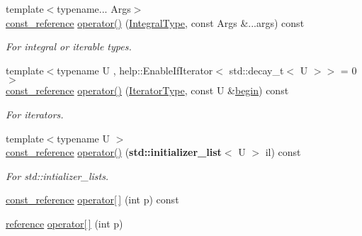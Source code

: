 {\bf }\par
\begin{DoxyCompactItemize}
\item 
{\footnotesize template$<$typename... Args$>$ }\\\hyperlink{classcnt_1_1help_1_1Slice_aed38e8e92115049f9c3b78ee67bdc5c4}{const\+\_\+reference} \hyperlink{classcnt_1_1help_1_1Slice_a5f6ebc78fcb07cb04aed2707e83efd92}{operator()} (\hyperlink{structcnt_1_1help_1_1IntegralType}{Integral\+Type}, const Args \&...args) const 
\begin{DoxyCompactList}\small\item\em For integral or iterable types. \end{DoxyCompactList}\item 
{\footnotesize template$<$typename U , help\+::\+Enable\+If\+Iterator$<$ std\+::decay\+\_\+t$<$ U $>$$>$  = 0$>$ }\\\hyperlink{classcnt_1_1help_1_1Slice_aed38e8e92115049f9c3b78ee67bdc5c4}{const\+\_\+reference} \hyperlink{classcnt_1_1help_1_1Slice_a28aad2a3fb6704596e1a317add0e3477}{operator()} (\hyperlink{structcnt_1_1help_1_1IteratorType}{Iterator\+Type}, const U \&\hyperlink{classcnt_1_1help_1_1Slice_aa5686f75940716e2568165e3b88d89d3}{begin}) const 
\begin{DoxyCompactList}\small\item\em For iterators. \end{DoxyCompactList}\item 
{\footnotesize template$<$typename U $>$ }\\\hyperlink{classcnt_1_1help_1_1Slice_aed38e8e92115049f9c3b78ee67bdc5c4}{const\+\_\+reference} \hyperlink{classcnt_1_1help_1_1Slice_a0263b9218c9f281b737dd9231f9c43e7}{operator()} ({\bf std\+::initializer\+\_\+list}$<$ U $>$ il) const 
\begin{DoxyCompactList}\small\item\em For \textquotesingle{}std\+::intializer\+\_\+lists\textquotesingle{}. \end{DoxyCompactList}\item 
\hyperlink{classcnt_1_1help_1_1Slice_aed38e8e92115049f9c3b78ee67bdc5c4}{const\+\_\+reference} \hyperlink{classcnt_1_1help_1_1Slice_a01908e8f74cf4a2a4d69ee8ad5f1a431}{operator\mbox{[}$\,$\mbox{]}} (int p) const 
\item 
\hyperlink{classcnt_1_1help_1_1Slice_a5e5e9b497c124710fcfe1e185e4801f3}{reference} \hyperlink{classcnt_1_1help_1_1Slice_a8eaabe725363ef76a42c15aadf7baa50}{operator\mbox{[}$\,$\mbox{]}} (int p)
\end{DoxyCompactItemize}

